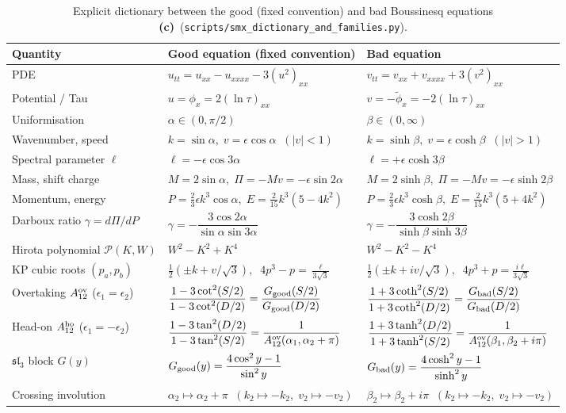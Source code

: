 \documentclass[11pt,a4paper]{article}
\newcommand{\Lc}{\textsf{\textbf{(c)}}}
\newcommand{\script}[1]{\texttt{scripts/\allowbreak #1}}
\newcommand{\cP}{\mathcal{P}}
\theoremstyle{remark}
\begin{document}
\begin{table}[ht]
\centering\small
\caption{Explicit dictionary between the good (fixed convention) and bad Boussinesq equations \Lc\ (\script{smx\_dictionary\_and\_families.py}).}\label{tab:dict}
\begin{tabular}{@{}lll@{}}
\toprule
Quantity & Good equation (fixed convention) & Bad equation \\
\midrule
PDE & $u_{tt}=u_{xx}-u_{xxxx}-3(u^2)_{xx}$ & $v_{tt}=v_{xx}+v_{xxxx}+3(v^2)_{xx}$ \\
Potential / Tau & $u=\phi_x=2(\ln\tau)_{xx}$ & $v=-\tilde\phi_x=-2(\ln\tau)_{xx}$ \\
Uniformisation & $\alpha\in(0,\pi/2)$ & $\beta\in(0,\infty)$ \\
Wavenumber, speed & $k=\sin\alpha,\; v=\epsilon\cos\alpha\;\;(|v|<1)$ & $k=\sinh\beta,\; v=\epsilon\cosh\beta\;\;(|v|>1)$ \\
Spectral parameter $\ell$ & $\ell=-\epsilon\cos 3\alpha$ & $\ell=+\epsilon\cosh 3\beta$ \\
Mass, shift charge & $M=2\sin\alpha,\; \Pi=-Mv=-\epsilon\sin 2\alpha$ & $M=2\sinh\beta,\; \Pi=-Mv=-\epsilon\sinh 2\beta$ \\
Momentum, energy & $P=\tfrac23\epsilon k^3\cos\alpha,\; E=\tfrac2{15}k^3(5-4k^2)$ & $P=\tfrac23\epsilon k^3\cosh\beta,\; E=\tfrac2{15}k^3(5+4k^2)$ \\
Darboux ratio $\gamma=d\Pi/dP$ & $\gamma=-\dfrac{3\cos 2\alpha}{\sin\alpha\sin 3\alpha}$ & $\gamma=-\dfrac{3\cosh 2\beta}{\sinh\beta\sinh 3\beta}$ \\
Hirota polynomial $\cP(K,W)$ & $W^2-K^2+K^4$ & $W^2-K^2-K^4$ \\
KP cubic roots $(p_a,p_b)$ & $\tfrac12(\pm k+v/\sqrt3),\;\; 4p^3-p=\tfrac{\ell}{3\sqrt3}$ & $\tfrac12(\pm k+iv/\sqrt3),\;\; 4p^3+p=\tfrac{i\ell}{3\sqrt3}$ \\
Overtaking $A_{12}^{\rm ov}$ ($\epsilon_1=\epsilon_2$) & $\dfrac{1-3\cot^2(S/2)}{1-3\cot^2(D/2)}=\dfrac{G_{\rm good}(S/2)}{G_{\rm good}(D/2)}$ & $\dfrac{1+3\coth^2(S/2)}{1+3\coth^2(D/2)}=\dfrac{G_{\rm bad}(S/2)}{G_{\rm bad}(D/2)}$ \\
Head-on $A_{12}^{\rm ho}$ ($\epsilon_1=-\epsilon_2$) & $\dfrac{1-3\tan^2(D/2)}{1-3\tan^2(S/2)}=\dfrac{1}{A_{12}^{\rm ov}(\alpha_1,\alpha_2+\pi)}$ & $\dfrac{1+3\tanh^2(D/2)}{1+3\tanh^2(S/2)}=\dfrac{1}{A_{12}^{\rm ov}(\beta_1,\beta_2+i\pi)}$ \\
$\mathfrak{sl}_3$ block $G(y)$ & $G_{\rm good}(y)=\dfrac{4\cos^2 y-1}{\sin^2 y}$ & $G_{\rm bad}(y)=\dfrac{4\cosh^2 y-1}{\sinh^2 y}$ \\
Crossing involution & $\alpha_2\mapsto\alpha_2+\pi\;\;(k_2\mapsto -k_2,\; v_2\mapsto -v_2)$ & $\beta_2\mapsto\beta_2+i\pi\;\;(k_2\mapsto -k_2,\; v_2\mapsto -v_2)$ \\
\bottomrule
\end{tabular}
\end{table}
\end{document}
